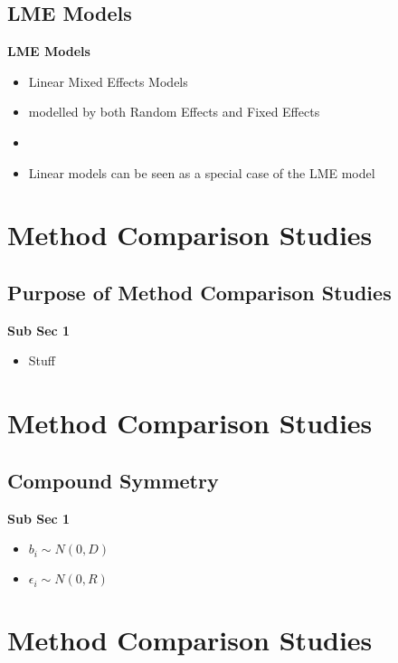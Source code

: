 \documentclass[compress]{beamer}        %
\makeatletter
\newcommand{\tcb}{\textcolor{beamer@blendedblue}}
\makeatother
\begin{document}
\subsection{LME Models}
\begin{frame}{\bf \tcb{LME Models}}
\begin{itemize}\itemsep0.7cm
\item Linear Mixed Effects Models
\item modelled by both Random Effects and Fixed Effects
\item
\item Linear models can be seen as a special case of the LME model

\end{itemize}
\end{frame}
\section[Method Comparison Studies]{Method Comparison Studies}
\subsection{Purpose of Method Comparison Studies}
\begin{frame}{\bf \tcb{Sub Sec 1}}
\begin{itemize}\itemsep0.7cm
\item Stuff
\end{itemize}
\end{frame}

\section[Method Comparison Studies]{Method Comparison Studies}
\subsection{Compound Symmetry}
\begin{frame}{\bf \tcb{Sub Sec 1}}
\begin{itemize}\itemsep0.7cm
\item $b_i \sim N(0,D)$
\item $\epsilon_i \sim N(0,R)$
\end{itemize}
\end{frame}
\section[Method Comparison Studies]{Method Comparison Studies}
\end{document}
